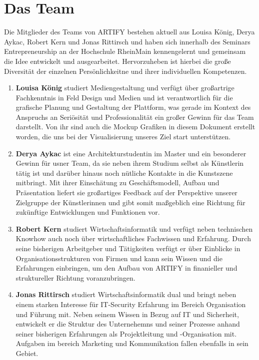 \documentclass[11pt,a4paper]{report}
\begin{document}
\chapter{Das Team}
Die Mitglieder des Teams von ARTIFY bestehen aktuell aus Louisa König, Derya Aykac, Robert Kern und Jonas Rittirsch und haben sich innerhalb des Seminars Entrepreneurship an der Hochschule RheinMain kennengelernt und gemeinsam die Idee entwickelt und ausgearbeitet. Hervorzuheben ist hierbei die große Diversität der einzelnen Persönlichkeitne und ihrer individuellen Kompetenzen.
\begin{enumerate}
    \item \textbf{Louisa König} studiert Mediengestaltung und verfügt über großartrige Fachkenntnis in Feld Design und Medien und ist verantwortlich für die grafische Planung und Gestaltung der Plattform, was gerade im Kontext des Anspruchs an Seriösität und Professionalität ein großer Gewinn für das Team darstellt. Von ihr sind auch die Mockup Grafiken in diesem Dokument erstellt worden, die uns bei der Visualisierung unseres Ziel start unterstützen.
    \item \textbf{Derya Aykac} ist eine Architekturstudentin im Master und ein besonderer Gewinn für usner Team, da sie neben ihrem Studium selbst als Künstlerin tätig ist und darüber hinaus noch nütliche Kontakte in die Kunstszene mitbringt. Mit ihrer Einschätung zu Geschäftsmodell, Aufbau und Präsentation liefert sie großartiges Feedback auf der Perspektive unserer Zielgruppe der Künstlerinnen und gibt somit maßgeblich eine Richtung für zukünftige Entwicklungen und Funktionen vor.  
    \item \textbf{Robert Kern} studiert Wirtschaftsinformatik und verfügt neben technischen Knowhow auch noch über wirtschaftliches Fachwissen und Erfahrung. Durch seine bisherigen Arbeitgeber und Tätigkeiten verfügt er über Einblicke in Organisationsstrukturen von Firmen und kann sein Wissen und die Erfahrungen einbringen, um den Aufbau von ARTIFY in finanieller und struktureller Richtung voranzubringen.
    \item \textbf{Jonas Rittirsch} studiert Wirtschaftsinformatik dual und bringt neben einem starken Interesse für IT-Security Erfahrung im Bereich Organisation und Führung mit. Neben seinem Wissen in Bezug auf IT und Sicherheit, entwickelt er die Struktur des Unternehemns und seiner Prozesse anhand seiner bisherigen Erfahrungen als Projektleitung und -Organisation mit. Aufgaben im bereich Marketing und Kommunikation fallen ebenfalls in sein Gebiet. 
\end{enumerate}
\end{document}
